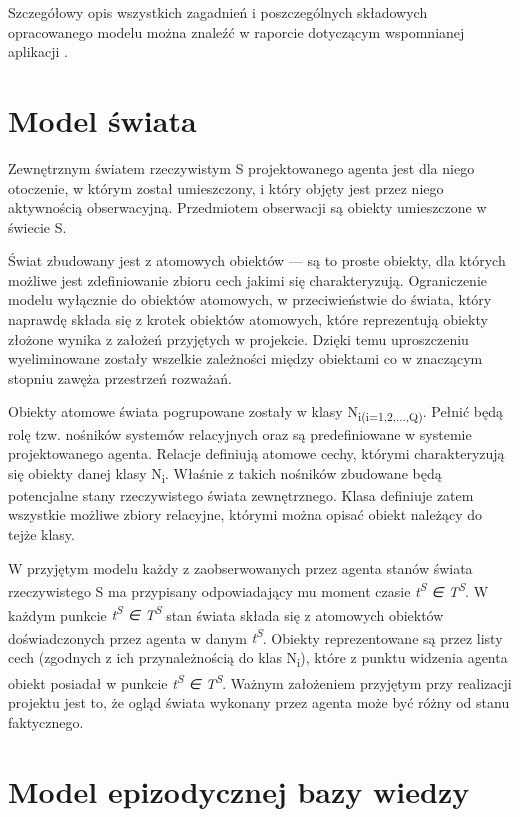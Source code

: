 Szczegółowy opis wszystkich zagadnień i poszczególnych składowych opracowanego modelu można znaleźć w raporcie dotyczącym wspomnianej aplikacji \cite{raport}.

\section{Model świata}   %

Zewnętrznym światem rzeczywistym S projektowanego agenta jest dla niego otoczenie, w którym został umieszczony, i który objęty jest przez niego aktywnością obserwacyjną. Przedmiotem obserwacji są obiekty umieszczone w świecie S.

Świat zbudowany jest z atomowych obiektów --- są to proste obiekty, dla których możliwe jest zdefiniowanie zbioru cech jakimi się charakteryzują. Ograniczenie modelu wyłącznie do obiektów atomowych, w przeciwieństwie do świata, który naprawdę składa się z krotek obiektów atomowych, które reprezentują obiekty złożone wynika z założeń przyjętych w projekcie. Dzięki temu uproszczeniu wyeliminowane zostały wszelkie zależności między obiektami co w znaczącym stopniu zawęża przestrzeń rozważań.

Obiekty atomowe świata pogrupowane zostały w klasy N\textsubscript{i(i=1,2,...,Q)}. Pełnić będą rolę tzw. nośników systemów relacyjnych oraz są predefiniowane w systemie projektowanego agenta. Relacje definiują atomowe cechy, którymi charakteryzują się obiekty danej klasy N\textsubscript{i}. Właśnie z takich nośników zbudowane będą potencjalne stany rzeczywistego świata zewnętrznego. Klasa definiuje zatem wszystkie możliwe zbiory relacyjne, którymi można opisać obiekt należący do tejże klasy.

W przyjętym modelu każdy z zaobserwowanych przez agenta stanów świata rzeczywistego S ma przypisany odpowiadający mu moment czasie 
\textit{t\textsuperscript{S} ∈ T\textsuperscript{S}}. 
W każdym punkcie 
\textit{t\textsuperscript{S} ∈ T\textsuperscript{S}} 
stan świata składa się z atomowych obiektów doświadczonych przez agenta w danym 
\textit{t\textsuperscript{S}}. 
Obiekty reprezentowane są przez listy cech (zgodnych z ich przynależnością do klas N\textsubscript{i}), które z punktu widzenia agenta obiekt posiadał w punkcie 
\textit{t\textsuperscript{S} ∈ T\textsuperscript{S}}.
Ważnym założeniem przyjętym przy realizacji projektu jest to, że ogląd świata wykonany przez agenta może być różny od stanu faktycznego.

\section{Model epizodycznej bazy wiedzy}

